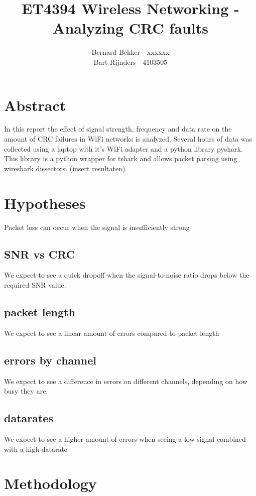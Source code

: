 \documentclass{article}
\title{ET4394 Wireless Networking - Analyzing CRC faults}
\date{}
\author{
Bernard Bekker - xxxxxx \\
Bart Rijnders - 4103505
}
\begin{document}
\maketitle

\section{Abstract}

In this report the effect of signal strength, frequency and data rate on the amount of CRC failures in WiFi networks is analyzed. Several hours of data was collected using a laptop with it's WiFi adapter and a python library pyshark. This library is a python wrapper for tshark and allows packet parsing using wireshark dissectors. (insert resultaten)


\section{Hypotheses}

Packet loss can occur when the signal is insufficiently strong

\subsection{SNR vs CRC}

We expect to see a quick dropoff when the signal-to-noise ratio drops below the required SNR value.

\subsection{packet length}
We expect to see a linear amount of errors compared to packet length

\subsection{errors by channel}
We expect to see a difference in errors on different channels, depending on how busy they are.

\subsection{datarates}
We expect to see a higher amount of errors when seeing a low signal combined with a high datarate

\section{Methodology}
\end{document}
